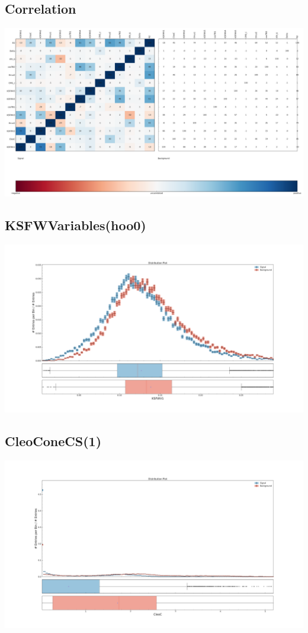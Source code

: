 \documentclass[10pt,a4paper]{article}
\begin{document}
\subsection{Correlation}
\begin{center}
\includegraphics[width=1.0\textwidth]{correlation_plot.pdf}
\end{center}
\subsection{KSFWVariables(hoo0)}
\begin{center}
\includegraphics[width=1.0\textwidth]{variable_7928284295432637125.pdf}
\end{center}
\subsection{CleoConeCS(1)}
\begin{center}
\includegraphics[width=1.0\textwidth]{variable_6915851416951660801.pdf}
\end{center}
\end{document}
